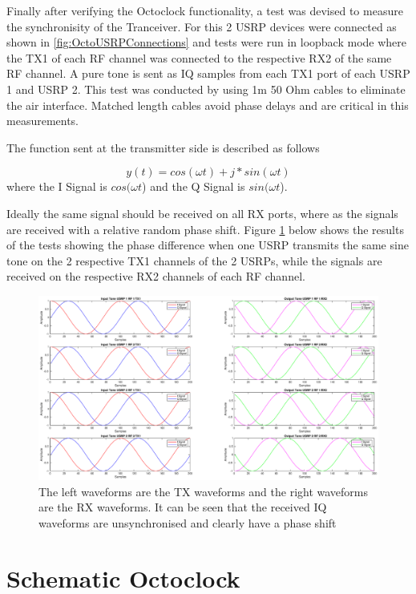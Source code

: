 Finally after verifying the Octoclock functionality, a test was devised to measure the synchronisity of the Tranceiver. For this 2 USRP devices were connected as shown in \ref{fig:OctoUSRPConnections} and tests were run in loopback mode where the TX1 of each RF channel was connected to the respective RX2 of the same RF channel. A pure tone is sent as IQ samples from each TX1 port of each USRP 1 and USRP 2. This test was conducted by using 1m 50 Ohm cables to eliminate the air interface. Matched length cables avoid phase delays and are critical in this measurements.

The function sent at the transmitter side is described as follows

\begin{equation}
    y(t) = cos(\omega{t}) + j*sin(\omega{t})
\end{equation}
where the I Signal is $cos(\omega{t}$) and the Q Signal is $sin(\omega{t}$).

Ideally the same signal should be received on all RX ports, where as the signals are received with a relative random phase shift. Figure \ref{fig:SyncFail2Ch} below shows the results of the tests showing the phase difference when one USRP transmits the same sine tone on the 2 respective TX1 channels of the 2 USRPs, while the signals are received on the respective RX2 channels of each RF channel.

\begin{landscape}
\begin{figure}[H]
    \centering
    \includegraphics[width=22cm]{images/SyncIssues.eps}
    \caption{The left waveforms are the TX waveforms and the right waveforms are the RX waveforms. It can be seen that the received IQ waveforms are unsynchronised and clearly have a phase shift}
    \label{fig:SyncFail2Ch}%
\end{figure}
\end{landscape}

\chapter{Schematic Octoclock}
\label{ch:HWSchOctoClock}


